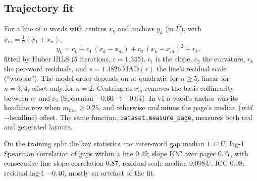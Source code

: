 \documentclass[11pt,a4paper]{article}
\newcommand{\U}{\ensuremath{U}}
\begin{document}
\subsection{Trajectory fit}
For a line of $n$ words with centres $x_k$ and anchors $y_k$ (in \U), with
$x_m=\tfrac12(x_1+x_n)$,
\begin{equation}
y_k = c_0 + c_1\,(x_k-x_m) + c_2\,(x_k-x_m)^2 + r_k ,
\label{eq:traj}
\end{equation}
fitted by Huber IRLS (5 iterations, $c=1.345$). $c_1$ is the slope, $c_2$ the
curvature, $r_k$ the per-word residuals, and $s=1.4826\,\mathrm{MAD}(r)$ the
line's residual scale (``wobble''). The model order depends on $n$: quadratic
for $n\ge5$, linear for $n=3,4$, offset only for $n=2$. Centring at $x_m$
removes the basis collinearity between $c_1$ and $c_2$ (Spearman $-0.60\to-0.04$).
In v1 a word's anchor was its headline row when $m_\text{frac}\ge0.25$, and
otherwise \textit{mid} minus the page's median (\textit{mid}$-$headline)
offset. The same function, \texttt{dataset.measure\_page}, measures both real
and generated layouts.

On the training split the key statistics are: inter-word gap median
$1.14\,\U$, lag-1 Spearman correlation of gaps within a line 0.49; slope ICC
over pages 0.77, with consecutive-line slope correlation 0.87; residual scale
median $0.098\,\U$, ICC 0.08; residual lag-1 $-0.40$, mostly an artefact of the
fit.
\end{document}
